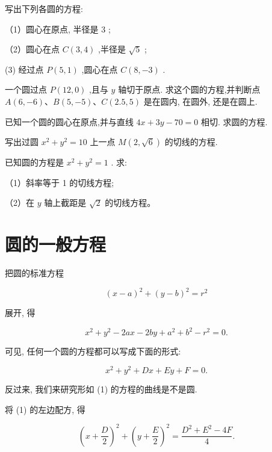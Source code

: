 \documentclass[lang=cn,newtx,10pt,scheme=chinese]{elegantbook}
\begin{document}
\begin{problemset}[练习]

\item 写出下列各圆的方程:

（1）圆心在原点, 半径是 3 ;

（2）圆心在点 \(C\left( {3,4}\right)\) ,半径是 \(\sqrt{5}\) ;

(3) 经过点 \(P\left( {5,1}\right)\) ,圆心在点 \(C\left( {8, - 3}\right)\) .

\item 一个圆过点 \(P\left( {{12},0}\right)\) ,且与 \(y\) 轴切于原点. 求这个圆的方程,并判断点 \(A\left( {6, - 6}\right) \text{、}B\left( {5, - 5}\right) \text{、}C\left( {{2.5},5}\right)\) 是在圆内, 在圆外, 还是在圆上.

\item 已知一个圆的圆心在原点,并与直线 \({4x} + {3y} - {70} = 0\) 相切. 求圆的方程.

\item 写出过圆 \({x}^{2} + {y}^{2} = {10}\) 上一点 \(M\left( {2,\sqrt{6}}\right)\) 的切线的方程.

\item 已知圆的方程是 \({x}^{2} + {y}^{2} = 1\) . 求:

（1）斜率等于 1 的切线方程;

（2）在 \(y\) 轴上截距是 \(\sqrt{2}\) 的切线方程。

\end{problemset}

\section{圆的一般方程}

把圆的标准方程

\[
    {\left( x - a\right) }^{2} + {\left( y - b\right) }^{2} = {r}^{2}
\]

展开, 得

\[
    {x}^{2} + {y}^{2} - {2ax} - {2by} + {a}^{2} + {b}^{2} - {r}^{2} = 0.
\]

可见, 任何一个圆的方程都可以写成下面的形式:

\[
    {x}^{2} + {y}^{2} + {Dx} + {Ey} + F = 0. \tag{1}
\]

反过来, 我们来研究形如 (1) 的方程的曲线是不是圆.

将 (1) 的左边配方, 得

\[
    {\left( x + \frac{D}{2}\right) }^{2} + {\left( y + \frac{E}{2}\right) }^{2} = \frac{{D}^{2} + {E}^{2} - {4F}}{4}. \tag{2}
\]
\end{document}
